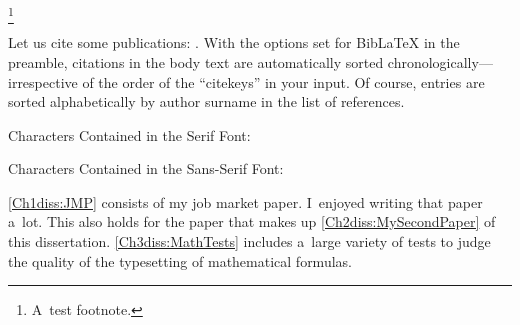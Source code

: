 


\makeatletter
\renewcommand{\@makefnmark}{{\sufigures\@makefnmarkorig}}
\makeatother

\blindtext[1]%
\unskip\unskip\unskip\footnote{A~test footnote.}

\knutext

Let us cite some publications: \cite{Andersen2008, Andreoni2012, Balakrishnan2016, Koszegi2013}. With the options set for BibLaTeX in the preamble, citations in the body text are automatically sorted chronologically---irrespective of the order of the ``citekeys'' in your input. Of course, entries are sorted alphabetically by author surname in the list of references.

\begin{table}[t!!!]
	\caption{Characters Contained in the Serif Font: \savermdefaultfortext}
	\rmfamily
	\makeatletter
	\xfonttable{\f@encoding}{\f@family}{\f@series}{\f@shape}
	\makeatother
\end{table}

\begin{table}[t!!!]
	\caption{Characters Contained in the Sans-Serif Font: \savesffamily}
	\sffamily
	\makeatletter
	\xfonttable{\f@encoding}{\f@family}{\f@series}{\f@shape}
	\makeatother
\end{table}

\Blindtext

\autoref{Ch1diss:JMP} consists of my job market paper. I~enjoyed writing that paper a~lot. This also holds for the paper that makes up \autoref{Ch2diss:MySecondPaper} of this dissertation. \autoref{Ch3diss:MathTests} includes a~large variety of tests to judge the quality of the typesetting of mathematical formulas.
